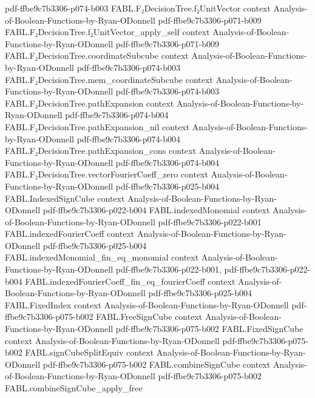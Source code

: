 \begin{theorem}
{    pdf-ffbe9c7b3306-p074-b003}
\proofstep
  {FABL.F₂DecisionTree.f₂UnitVector}
  {context}
  {Analysis-of-Boolean-Functions-by-Ryan-ODonnell}
  {pdf-ffbe9c7b3306-p071-b009}
\proofstep
  {FABL.F₂DecisionTree.f₂UnitVector_apply_self}
  {context}
  {Analysis-of-Boolean-Functions-by-Ryan-ODonnell}
  {pdf-ffbe9c7b3306-p071-b009}
\proofstep
  {FABL.F₂DecisionTree.coordinateSubcube}
  {context}
  {Analysis-of-Boolean-Functions-by-Ryan-ODonnell}
  {pdf-ffbe9c7b3306-p074-b003}
\proofstep
  {FABL.F₂DecisionTree.mem_coordinateSubcube}
  {context}
  {Analysis-of-Boolean-Functions-by-Ryan-ODonnell}
  {pdf-ffbe9c7b3306-p074-b003}
\proofstep
  {FABL.F₂DecisionTree.pathExpansion}
  {context}
  {Analysis-of-Boolean-Functions-by-Ryan-ODonnell}
  {pdf-ffbe9c7b3306-p074-b004}
\proofstep
  {FABL.F₂DecisionTree.pathExpansion_nil}
  {context}
  {Analysis-of-Boolean-Functions-by-Ryan-ODonnell}
  {pdf-ffbe9c7b3306-p074-b004}
\proofstep
  {FABL.F₂DecisionTree.pathExpansion_cons}
  {context}
  {Analysis-of-Boolean-Functions-by-Ryan-ODonnell}
  {pdf-ffbe9c7b3306-p074-b004}
\proofstep
  {FABL.F₂DecisionTree.vectorFourierCoeff_zero}
  {context}
  {Analysis-of-Boolean-Functions-by-Ryan-ODonnell}
  {pdf-ffbe9c7b3306-p025-b004}
\proofstep
  {FABL.IndexedSignCube}
  {context}
  {Analysis-of-Boolean-Functions-by-Ryan-ODonnell}
  {pdf-ffbe9c7b3306-p022-b004}
\proofstep
  {FABL.indexedMonomial}
  {context}
  {Analysis-of-Boolean-Functions-by-Ryan-ODonnell}
  {pdf-ffbe9c7b3306-p022-b001}
\proofstep
  {FABL.indexedFourierCoeff}
  {context}
  {Analysis-of-Boolean-Functions-by-Ryan-ODonnell}
  {pdf-ffbe9c7b3306-p025-b004}
\proofstep
  {FABL.indexedMonomial_fin_eq_monomial}
  {context}
  {Analysis-of-Boolean-Functions-by-Ryan-ODonnell}
  {pdf-ffbe9c7b3306-p022-b001,
    pdf-ffbe9c7b3306-p022-b004}
\proofstep
  {FABL.indexedFourierCoeff_fin_eq_fourierCoeff}
  {context}
  {Analysis-of-Boolean-Functions-by-Ryan-ODonnell}
  {pdf-ffbe9c7b3306-p025-b004}
\proofstep
  {FABL.FixedIndex}
  {context}
  {Analysis-of-Boolean-Functions-by-Ryan-ODonnell}
  {pdf-ffbe9c7b3306-p075-b002}
\proofstep
  {FABL.FreeSignCube}
  {context}
  {Analysis-of-Boolean-Functions-by-Ryan-ODonnell}
  {pdf-ffbe9c7b3306-p075-b002}
\proofstep
  {FABL.FixedSignCube}
  {context}
  {Analysis-of-Boolean-Functions-by-Ryan-ODonnell}
  {pdf-ffbe9c7b3306-p075-b002}
\proofstep
  {FABL.signCubeSplitEquiv}
  {context}
  {Analysis-of-Boolean-Functions-by-Ryan-ODonnell}
  {pdf-ffbe9c7b3306-p075-b002}
\proofstep
  {FABL.combineSignCube}
  {context}
  {Analysis-of-Boolean-Functions-by-Ryan-ODonnell}
  {pdf-ffbe9c7b3306-p075-b002}
\proofstep
  {FABL.combineSignCube_apply_free}

\end{theorem}
